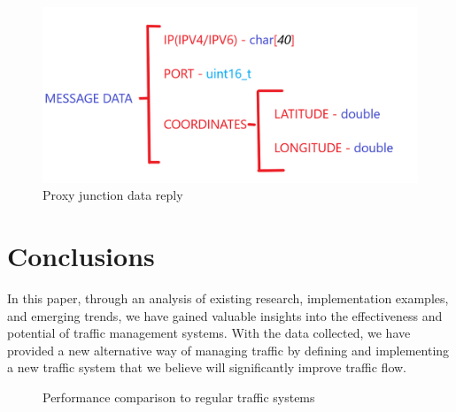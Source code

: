 \documentclass[17pt]{report}
\begin{document}
\begin{figure}[h!]
    \includegraphics[width=\textwidth]{Sketches/ProxyJunctionMessage.png}
    \caption{Proxy junction data reply}
    \label{fig:Proxy junction data reply}
\end{figure}

\chapter{Conclusions}
\indent \indent
In this paper, through an analysis of existing research,
implementation examples, and emerging trends, we have gained valuable
insights into the effectiveness and potential of traffic management
systems. With the data collected, we have provided a new alternative 
way of managing traffic by defining and implementing a new traffic 
system that we believe will significantly improve traffic flow. \\

\begin{figure}[h!]
    \centering
    \label{fig:Optimizer vs no optimizers}
    \caption{Performance comparison to regular traffic systems}
\end{figure}
\end{document}
